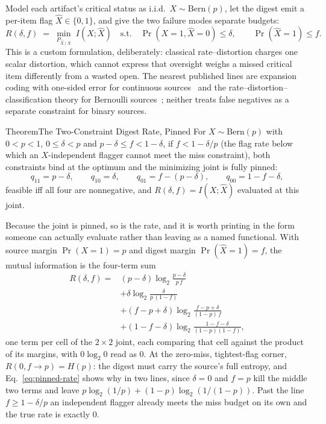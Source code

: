 \documentclass[11pt,a4paper]{article}
\theoremstyle{definition}
\theoremstyle{plain}
\begin{document}
Model each artifact's critical status as i.i.d.\ $X\sim\mathrm{Bern}(p)$, let
the digest emit a per-item flag $\hat X\in\{0,1\}$, and give the two failure modes
separate budgets:
\[
R(\delta,f)\;=\;\min_{P_{\hat X\mid X}}\; I(X;\hat X)
\quad\text{s.t.}\quad
\Pr(X{=}1,\hat X{=}0)\le\delta,
\qquad
\Pr(\hat X{=}1)\le f .
\]
This is a custom formulation, deliberately: classical rate--distortion charges one
scalar distortion, which cannot express that oversight weighs a missed critical
item differently from a wasted open. The nearest published lines are expansion coding
with one-sided error for continuous sources~ and the
rate--distortion--classification theory for Bernoulli sources~; neither
treats false negatives as a separate constraint for binary sources.

\begin{pdclaim}{Theorem}{The Two-Constraint Digest Rate, Pinned}
\setlength{\parskip}{4pt plus 1pt}
\label{thm:pinned-joint}
For $X\sim\mathrm{Bern}(p)$ with $0<p<1$, $0\le\delta<p$ and $p-\delta\le f<1-\delta$, if
$f<1-\delta/p$ (the flag rate below which an $X$-independent flagger cannot meet
the miss constraint), both constraints bind at the optimum and the minimizing joint
is fully pinned:
\[
q_{11}=p-\delta,\qquad q_{10}=\delta,\qquad q_{01}=f-(p-\delta),\qquad
q_{00}=1-f-\delta,
\]
feasible iff all four are nonnegative, and $R(\delta,f)=I(X;\hat X)$ evaluated at
this joint.

Because the joint is pinned, so is the rate, and it is worth printing
in the form someone can actually evaluate rather than leaving as a named
functional. With source margin $\Pr(X{=}1)=p$ and digest margin
$\Pr(\hat X{=}1)=f$, the mutual information is the four-term sum
\begin{equation}\label{eq:pinned-rate}
\begin{split}
R(\delta,f) ={}&(p-\delta)\log_2\frac{p-\delta}{p\,f} \\[
2pt]
&+\delta\log_2\frac{\delta}{p\,(1-f)} \\[2pt]
&+(f-p+\delta)\log_2\frac{f-p+\delta}{(1-p)\,f} \\[2pt]
&+(1-f-\delta)\log_2\frac{1-f-\delta}{(1-p)(1-f)},
\end{split}
\end{equation}
one term per cell of the $2\times2$ joint, each comparing that cell against the
product of its margins, with $0\log_2 0$ read as $0$.
At the zero-miss,
tightest-flag corner, $R(0,f{\to}p)=H(p)$: the digest
must carry the source's full entropy, and Eq.~\ref{eq:pinned-rate} shows why in
two lines, since $\delta=0$ and $f=p$ kill the middle two terms and leave
$p\log_2(1/p)+(1-p)\log_2(1/(1-p))$.
Past the line $f\ge 1-\delta/p$ an independent
flagger already meets the miss budget on its own and the true rate is exactly $0$.
\end{pdclaim}
\end{document}
